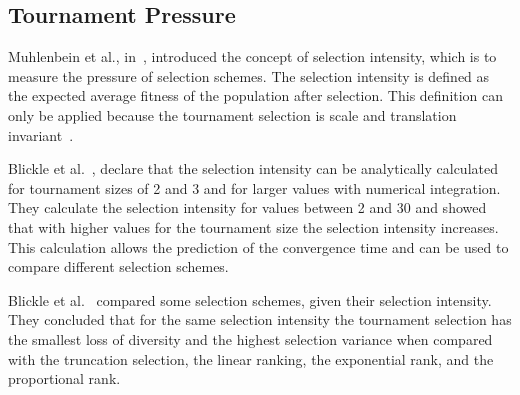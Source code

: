 %
%
%
%
%
%
%

\subsection{Tournament Pressure}\label{sec:background:tournament_pressure} 
Muhlenbein et al., in~\cite{muhlenbein1993predictive}, introduced the concept of selection intensity, which is to measure the pressure of selection schemes. The selection intensity is defined as the expected average fitness of the population after selection. This definition can only be applied because the tournament selection is scale and translation invariant~\cite{blickle1995mathematical}.

Blickle et al.~\cite{blickle1995mathematical}, declare that the selection intensity can be analytically calculated for tournament sizes of 2 and 3 and for larger values with numerical integration. They calculate the selection intensity for values between 2 and 30 and showed that with higher values for the tournament size the selection intensity increases. This calculation allows the prediction of the convergence time and can be used to compare different selection schemes.

Blickle et al.~\cite{blickle1995comparison} compared some selection schemes, given their selection intensity. They concluded that for the same selection intensity the tournament selection has the smallest loss of diversity and the highest selection variance when compared with the truncation selection, the linear ranking, the exponential rank, and the proportional rank.

